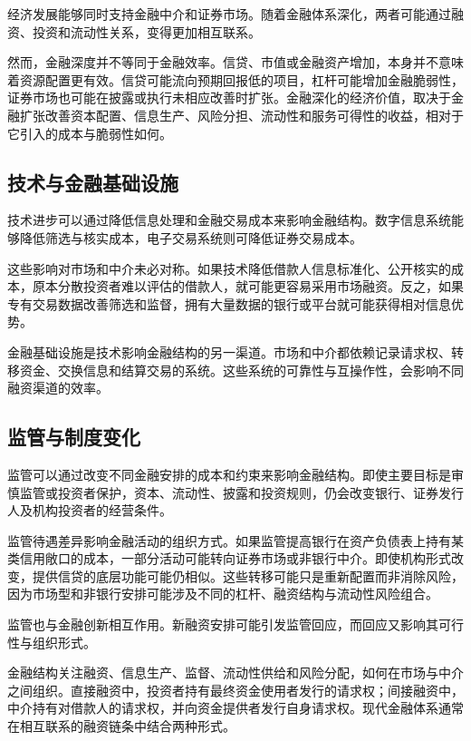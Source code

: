 经济发展能够同时支持金融中介和证券市场。随着金融体系深化，两者可能通过融资、投资和流动性关系，变得更加相互联系。

然而，金融深度并不等同于金融效率。信贷、市值或金融资产增加，本身并不意味着资源配置更有效。信贷可能流向预期回报低的项目，杠杆可能增加金融脆弱性，证券市场也可能在披露或执行未相应改善时扩张。金融深化的经济价值，取决于金融扩张改善资本配置、信息生产、风险分担、流动性和服务可得性的收益，相对于它引入的成本与脆弱性如何。

\subsection{技术与金融基础设施}

技术进步可以通过降低信息处理和金融交易成本来影响金融结构。数字信息系统能够降低筛选与核实成本，电子交易系统则可降低证券交易成本。

这些影响对市场和中介未必对称。如果技术降低借款人信息标准化、公开核实的成本，原本分散投资者难以评估的借款人，就可能更容易采用市场融资。反之，如果专有交易数据改善筛选和监督，拥有大量数据的银行或平台就可能获得相对信息优势。

金融基础设施是技术影响金融结构的另一渠道。市场和中介都依赖记录请求权、转移资金、交换信息和结算交易的系统。这些系统的可靠性与互操作性，会影响不同融资渠道的效率。


\subsection{监管与制度变化}

监管可以通过改变不同金融安排的成本和约束来影响金融结构。即使主要目标是审慎监管或投资者保护，资本、流动性、披露和投资规则，仍会改变银行、证券发行人及机构投资者的经营条件。

监管待遇差异影响金融活动的组织方式。如果监管提高银行在资产负债表上持有某类信用敞口的成本，一部分活动可能转向证券市场或非银行中介。即使机构形式改变，提供信贷的底层功能可能仍相似。这些转移可能只是重新配置而非消除风险，因为市场型和非银行安排可能涉及不同的杠杆、融资结构与流动性风险组合。

监管也与金融创新相互作用。新融资安排可能引发监管回应，而回应又影响其可行性与组织形式。



金融结构关注融资、信息生产、监督、流动性供给和风险分配，如何在市场与中介之间组织。直接融资中，投资者持有最终资金使用者发行的请求权；间接融资中，中介持有对借款人的请求权，并向资金提供者发行自身请求权。现代金融体系通常在相互联系的融资链条中结合两种形式。

